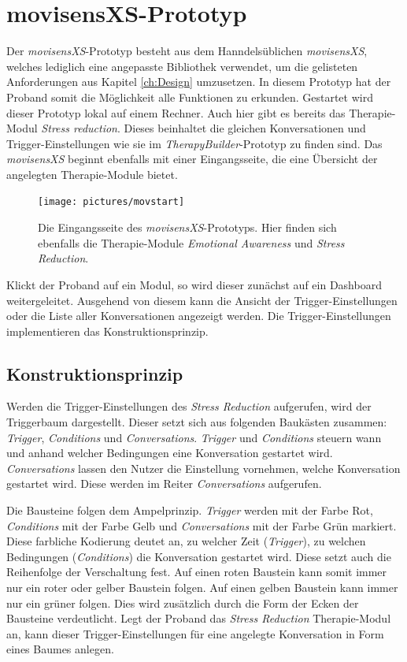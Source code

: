 \section{movisensXS-Prototyp}
Der \emph{movisensXS}-Prototyp besteht aus dem Hanndelsüblichen \emph{movisensXS}, welches lediglich eine angepasste Bibliothek verwendet, um die gelisteten Anforderungen aus Kapitel \ref{ch:Design} umzusetzen. In diesem Prototyp hat der Proband somit die Möglichkeit alle Funktionen zu erkunden. Gestartet wird dieser Prototyp lokal auf einem Rechner. Auch hier gibt es bereits das Therapie-Modul \emph{Stress reduction}. Dieses beinhaltet die gleichen Konversationen und Trigger-Einstellungen wie sie im \emph{TherapyBuilder}-Prototyp zu finden sind. Das \emph{movisensXS} beginnt ebenfalls mit einer Eingangsseite, die eine Übersicht der angelegten Therapie-Module bietet. 

\begin{figure}[h]
\centering
\texttt{[image: pictures/movstart]}
\caption{Die Eingangsseite des \emph{movisensXS}-Prototyps. Hier finden sich ebenfalls die Therapie-Module \emph{Emotional Awareness} und \emph{Stress Reduction}.}
\label{start}
\end{figure}

Klickt der Proband auf ein Modul, so wird dieser zunächst auf ein Dashboard weitergeleitet. Ausgehend von diesem kann die Ansicht der Trigger-Einstellungen oder die Liste aller Konversationen angezeigt werden. Die Trigger-Einstellungen implementieren das Konstruktionsprinzip.

\subsection{Konstruktionsprinzip}
Werden die Trigger-Einstellungen des \emph{Stress Reduction} aufgerufen, wird der Triggerbaum dargestellt. Dieser setzt sich aus folgenden Baukästen zusammen: \emph{Trigger}, \emph{Conditions} und \emph{Conversations}. \emph{Trigger} und \emph{Conditions} steuern wann und anhand welcher Bedingungen eine Konversation gestartet wird.  \emph{Conversations} lassen den Nutzer die Einstellung vornehmen, welche Konversation gestartet wird. Diese werden im Reiter \emph{Conversations} aufgerufen. 

Die Bausteine folgen dem Ampelprinzip. \emph{Trigger} werden mit der Farbe Rot, \emph{Conditions} mit der Farbe Gelb und \emph{Conversations} mit der Farbe Grün markiert. Diese farbliche Kodierung deutet an, zu welcher Zeit (\emph{Trigger}), zu welchen Bedingungen (\emph{Conditions}) die Konversation gestartet wird. Diese setzt auch die Reihenfolge der Verschaltung fest. Auf einen roten Baustein kann somit immer nur ein roter oder gelber Baustein folgen. Auf einen gelben Baustein kann immer nur ein grüner folgen. Dies wird zusätzlich durch die Form der Ecken der Bausteine verdeutlicht. Legt der Proband das \emph{Stress Reduction} Therapie-Modul an, kann dieser Trigger-Einstellungen für eine angelegte Konversation in Form eines Baumes anlegen.  


